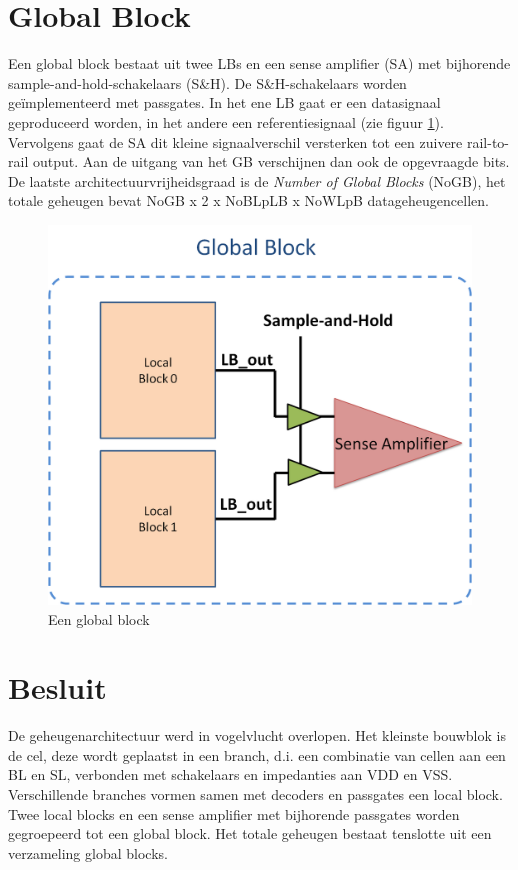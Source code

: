 \section{Global Block}
\label{globalblock}
Een global block bestaat uit twee LBs en een sense amplifier (SA) met bijhorende sample-and-hold-schakelaars (S\&H). De S\&H-schakelaars worden geïmplementeerd met passgates. In het ene LB gaat er een datasignaal geproduceerd worden, in het andere een referentiesignaal (zie figuur \ref{fig:GB}). Vervolgens gaat de SA dit kleine signaalverschil versterken tot een zuivere rail-to-rail output.
Aan de uitgang van het GB verschijnen dan ook de opgevraagde bits.
De laatste architectuurvrijheidsgraad is de \emph{Number of Global Blocks} (NoGB), het totale geheugen bevat NoGB x 2 x NoBLpLB x NoWLpB datageheugencellen.



\begin{figure}
  \centering
  \includegraphics[scale=0.3]{../fig/hfdstk-architecture-globalblock.png}
  \caption[Een global block]{Een global block}
  \label{fig:GB}
\end{figure}

\section{Besluit}
De geheugenarchitectuur werd in vogelvlucht overlopen. Het kleinste bouwblok is de cel, deze wordt geplaatst in een branch, d.i. een combinatie van cellen aan een BL en SL, verbonden met schakelaars en impedanties aan VDD en VSS. Verschillende branches vormen samen met decoders en passgates een local block. Twee local blocks en een sense amplifier met bijhorende passgates worden gegroepeerd tot een global block. Het totale geheugen bestaat tenslotte uit een verzameling global blocks.

